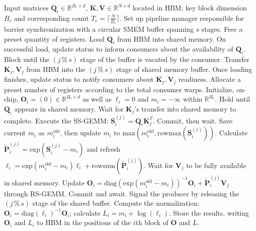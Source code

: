 \begin{algorithm}[H]
    \caption{\small\label{alg:flash3_wgmma_ws_only}\textsc{FlashAttention-3} forward pass \textbf{excluding} intra-consumer overlapping -- CTA-centric approach}
    \begin{algorithmic}[1]
\REQUIRE Input matrices $\mathbf{Q}_i \in \mathbb{R}^{B_r \times d}$, $\mathbf{K}, \mathbf{V} \in \mathbb{R}^{N \times d}$ located in HBM; key block dimension $B_c$ and corresponding count $T_c = \lceil \frac{N}{B_c} \rceil$.
\STATE Set up pipeline manager responsible for barrier synchronization with a circular SMEM buffer spanning $s$ stages.
\STATE Free a preset quantity of registers.
\STATE Load $\mathbf{Q}_i$ from HBM into shared memory.
\STATE On successful load, update status to inform consumers about the availability of $\mathbf{Q}_i$.
    \STATE Block until the $(j\,\%\,s)$ stage of the buffer is vacated by the consumer.
    \STATE Transfer $\mathbf{K}_j, \mathbf{V}_j$ from HBM into the $(j\,\%\,s)$ stage of shared memory buffer.
    \STATE Once loading finishes, update status to notify consumers about $\mathbf{K}_j, \mathbf{V}_j$ readiness.
\ENDFOR
\ELSE \STATE Allocate a preset number of registers according to the total consumer warps.
\STATE Initialize, on-chip, $\mathbf{O}_i = (0) \in \mathbb{R}^{B_r \times d}$ as well as $\ell_i = 0$ and $m_i = -\infty$ within $\mathbb{R}^{B_r}$.
\STATE Hold until $\mathbf{Q}_i$ appears in shared memory.
\STATE Wait for $\mathbf{K}_j$'s transfer into shared memory to complete.
\STATE Execute the SS-GEMM: $\mathbf{S}_i^{(j)} = \mathbf{Q}_i \mathbf{K}_j^T$. Commit, then wait. \label{alg:ws_only_gemm1}
\STATE Save current $m_i$ as $m_i^{\mathrm{old}}$, then update $m_i$ to $\mathrm{max}(m_i^{\mathrm{old}}, \mathrm{rowmax}(\mathbf{S}_i^{(j)}))$. \label{code-ws:softmax_start}
\STATE Calculate $\widetilde{\mathbf{P}}_i^{(j)} = \mathrm{exp}(\mathbf{S}_i^{(j)} - m_i)$ and refresh $\ell_i = \mathrm{exp}(m_i^{\mathrm{old}} - m_i) \ell_i + \mathrm{rowsum}(\widetilde{\mathbf{P}}_i^{(j)})$. \label{code-ws:softmax_end}
\STATE Wait for $\mathbf{V}_j$ to be fully available in shared memory.
\STATE Update $\mathbf{O}_i = \mathrm{diag}(\mathrm{exp}(m_i^{\mathrm{old}} - m_i))^{-1} \mathbf{O}_i + \widetilde{\mathbf{P}}_i^{(j)} \mathbf{V}_j$ through RS-GEMM. Commit and await. \label{alg:ws_only_gemm2}
\STATE Signal the producer by releasing the $(j\,\%\,s)$ stage of the shared buffer.
\ENDFOR
\STATE Compute the normalization: $\mathbf{O}_i = \mathrm{diag}(\ell_i)^{-1} \mathbf{O}_i$; calculate $L_i = m_i + \log(\ell_i)$.
\STATE Store the results, writing $\mathbf{O}_i$ and $L_i$ to HBM in the positions of the $i$th block of $\mathbf{O}$ and $L$.
\ENDIF
\end{algorithmic}
\end{algorithm}

